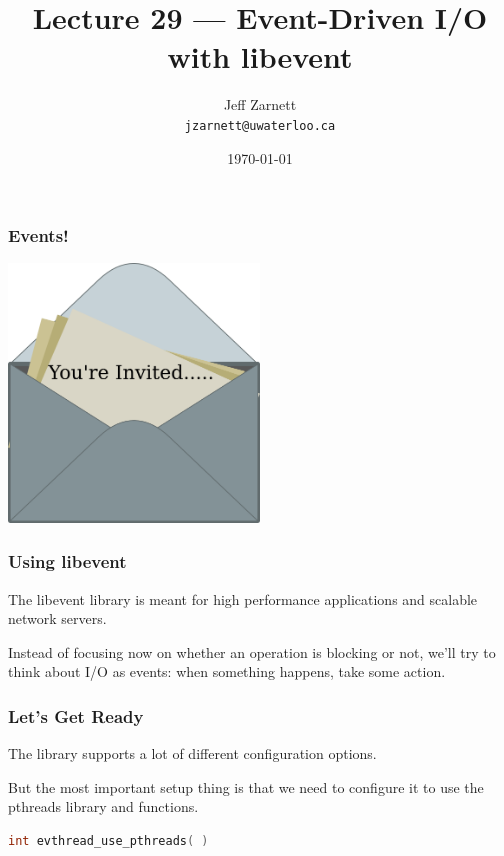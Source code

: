 

\title{Lecture 29 --- Event-Driven I/O with libevent }

\author{Jeff Zarnett \\ \small \texttt{jzarnett@uwaterloo.ca}}
\date{\today}




\begin{frame}
	\titlepage

\end{frame}



\begin{frame}
	\frametitle{Events!}

	\begin{center}
		\includegraphics[width=0.5\textwidth]{images/invitation}
	\end{center}


\end{frame}


\begin{frame}
	\frametitle{Using libevent}

	The libevent library is meant for high performance applications and scalable network servers.

	Instead of focusing now on whether an operation is blocking or not, we'll try to think about I/O as events: when something happens, take some action.

\end{frame}


\begin{frame}[fragile]
	\frametitle{Let's Get Ready}
	The library supports a lot of different configuration options.

	But the most important setup thing is that we need to configure it to use the pthreads library and functions.

	\begin{lstlisting}[language=C]
int evthread_use_pthreads( )
\end{lstlisting}

\end{frame}


